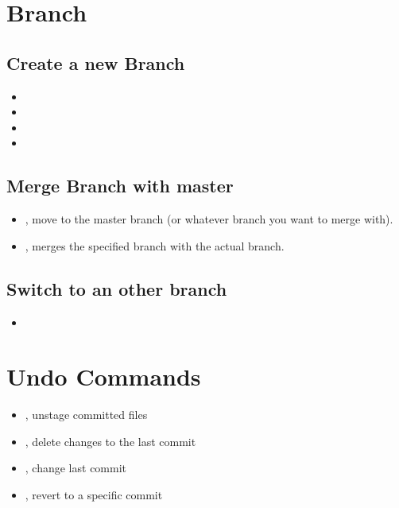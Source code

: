 \section{Branch}
\subsection{Create a new Branch}
\begin{itemize}
\item {}
\item {}
\item {}
\item {}
\end{itemize}

\subsection{Merge Branch with master}
\begin{itemize}
\item {}, move to the master branch (or whatever branch you want to merge with).
\item {}, merges the specified branch with the actual branch.
\end{itemize}

\subsection{Switch to an other branch}
\begin{itemize}
\item {}
\end{itemize}

\section{Undo Commands}
\begin{itemize}
\item {}, unstage committed files
\item {}, delete changes to the last commit
\item {}, change last commit
\item {}, revert to a specific commit
\end{itemize}

